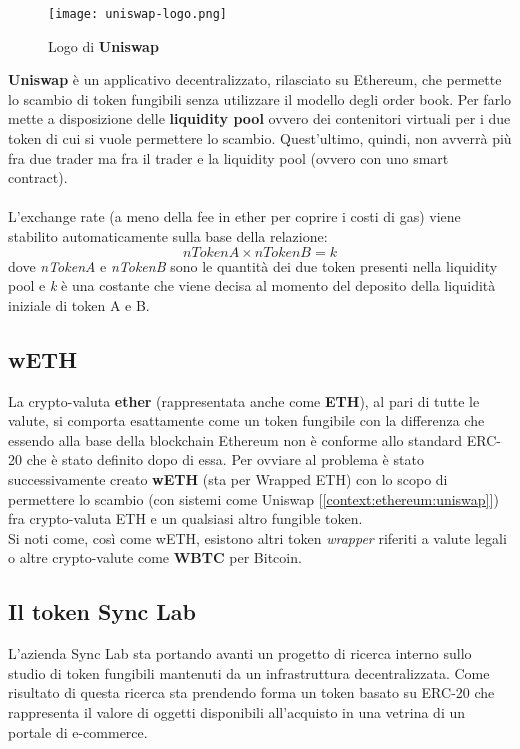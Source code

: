     \begin{figure}[h!]
        \centering
        \texttt{[image: uniswap-logo.png]}
        \caption{Logo di \textbf{Uniswap}}
    \end{figure}

    \textbf{Uniswap} è un applicativo decentralizzato, rilasciato su Ethereum, che permette lo scambio di token fungibili senza utilizzare il modello degli order book. Per farlo mette a disposizione delle \textbf{liquidity pool} ovvero dei contenitori virtuali per i due token di cui si vuole permettere lo scambio. Quest'ultimo, quindi, non avverrà più fra due trader ma fra il trader e la liquidity pool (ovvero con uno smart contract).
    \\\\
    L'exchange rate (a meno della fee in ether per coprire i costi di gas) viene stabilito automaticamente sulla base della relazione:
    \[
    nTokenA \times nTokenB = k
    \]
    dove \textit{nTokenA} e \textit{nTokenB} sono le quantità dei due token presenti nella liquidity pool e \textit{k} è una costante che viene decisa al momento del deposito della liquidità iniziale di token A e B.

    \subsection{wETH}
    La crypto-valuta \textbf{ether} (rappresentata anche come \textbf{ETH}), al pari di tutte le valute, si comporta esattamente come un token fungibile con la differenza che essendo alla base della blockchain Ethereum non è conforme allo standard ERC-20 che è stato definito dopo di essa. Per ovviare al problema è stato successivamente creato \textbf{wETH} (sta per Wrapped ETH) con lo scopo di permettere lo scambio (con sistemi come Uniswap [\autoref{context:ethereum:uniswap}]) fra crypto-valuta ETH e un qualsiasi altro fungible token.\\
    Si noti come, così come wETH, esistono altri token \textit{wrapper} riferiti a valute legali o altre crypto-valute come \textbf{WBTC} per Bitcoin.

    \subsection{Il token Sync Lab}
    L'azienda Sync Lab sta portando avanti un progetto di ricerca interno sullo studio di token fungibili mantenuti da un infrastruttura decentralizzata. Come risultato di questa ricerca sta prendendo forma un token basato su ERC-20 che rappresenta il valore di oggetti disponibili all'acquisto in una vetrina di un portale di e-commerce.

